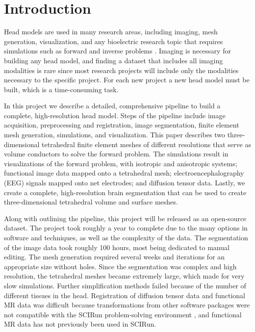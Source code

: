 
\section{Introduction}
\label{sec:intro}

Head models are used in many research areas, including imaging, mesh generation, visualization, and any bioelectric research topic that requires simulations such as forward and inverse problems \cite{ref:Brette2012}. Imaging is necessary for building any head model, and finding a dataset that includes all imaging modalities is rare since most research projects will include only the modalities necessary to the specific project. For each new project a new head model must be built, which is a time-consuming task.

In this project we describe a detailed, comprehensive pipeline to build a complete, high-resolution head model. Steps of the pipeline include image acquisition, preprocessing and registration, image segmentation, finite element mesh generation, simulations, and visualization. This paper describes two three-dimensional tetrahedral finite element meshes of different resolutions that serve as volume conductors to solve the forward problem. The simulations result in visualizations of the forward problem, with isotropic and anisotropic systems; functional image data mapped onto a tetrahedral mesh; electroencephalography (EEG) signals mapped onto net electrodes; and diffusion tensor data. Lastly, we create a complete, high-resolution brain segmentation that can be used to create three-dimensional tetrahedral volume and surface meshes. 

Along with outlining the pipeline, this project will be released as an open-source dataset. The project took roughly a year to complete due to the many options in software and techniques, as well as the complexity of the data. The segmentation of the image data took roughly 100 hours, most being dedicated to manual editing. The mesh generation required several weeks and iterations for an appropriate size without holes. Since the segmentation was complex and high resolution, the tetrahedral meshes became extremely large, which made for very slow simulations. Further simplification methods failed because of the number of different tissues in the head. Registration of diffusion tensor data and functional MR data was difficult because transformations from other software packages were not compatible with the SCIRun problem-solving environment \cite{ref:scirun}, and functional MR data has not previously been used in SCIRun.